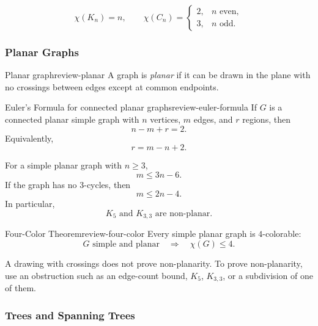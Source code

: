 \begin{examplebox}[title={Standard chromatic numbers}]
\[
\chi(K_n)=n,
\qquad
\chi(C_n)=
\begin{cases}
2, & n\text{ even},\\
3, & n\text{ odd}.
\end{cases}
\]
\end{examplebox}

\subsubsection{Planar Graphs}

\begin{definition}{Planar graph}{review-planar}
A graph is \emph{planar} if it can be drawn in the plane with no crossings between edges except at common endpoints.
\end{definition}

\begin{theorem}{Euler's Formula for connected planar graphs}{review-euler-formula}
If \(G\) is a connected planar simple graph with \(n\) vertices, \(m\) edges, and \(r\) regions, then
\[
n-m+r=2.
\]
Equivalently,
\[
r=m-n+2.
\]
\end{theorem}

\begin{keyformula}[title={Planar edge bounds}]
For a simple planar graph with \(n\ge 3\),
\[
m\le 3n-6.
\]
If the graph has no \(3\)-cycles, then
\[
m\le 2n-4.
\]
In particular,
\[
K_5\text{ and }K_{3,3}\text{ are non-planar}.
\]
\end{keyformula}

\begin{theorem}{Four-Color Theorem}{review-four-color}
Every simple planar graph is \(4\)-colorable:
\[
G\text{ simple and planar}
\quad\Longrightarrow\quad
\chi(G)\le 4.
\]
\end{theorem}

\begin{commonmistake}[title={Bad drawing is not non-planarity}]
A drawing with crossings does not prove non-planarity. To prove non-planarity, use an obstruction such as an edge-count bound, \(K_5\), \(K_{3,3}\), or a subdivision of one of them.
\end{commonmistake}

\subsubsection{Trees and Spanning Trees}

